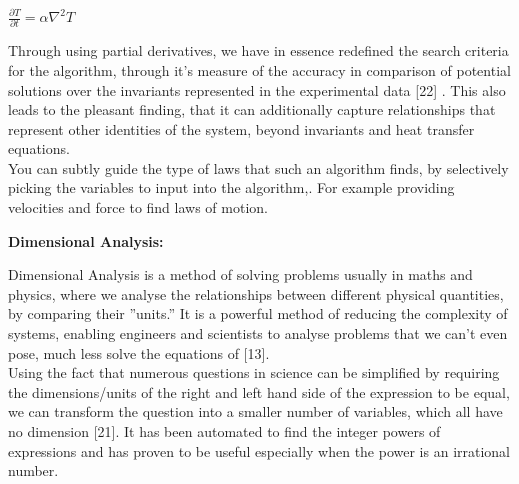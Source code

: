 \documentclass{article}
\begin{document}
\begin{center}
$\frac{\partial T}{\partial t} = \alpha \nabla^2 T$
\end{center}



Through using partial derivatives, we have in essence redefined the search criteria for the algorithm, through it's measure of the accuracy in comparison of potential solutions over the invariants represented in the experimental data [22] . This also leads to the pleasant finding, that it can additionally capture relationships that represent other identities of the system, beyond invariants and heat transfer equations. \\ 

You can subtly guide the type of laws that such an algorithm finds, by selectively picking the variables to input into the algorithm,. For example providing velocities and force to find laws of motion. \\ 





\begin{center} 
  \textbf {\Large Dimensional Analysis:}
\end{center}

Dimensional Analysis is a method of solving problems usually in maths and physics, where we analyse
the relationships between different physical quantities, by comparing their ”units.” It is a powerful
method of reducing the complexity of systems, enabling engineers and scientists to analyse problems
that we can’t even pose, much less solve the equations of [13].\\

Using the fact that numerous questions in science can be simplified by requiring the dimensions/units
of the right and left hand side of the expression to be equal, we can transform the question into
a smaller number of variables, which all have no dimension [21]. It has been automated to find the integer powers of expressions and has proven to be useful especially when the power is an irrational number.\\
\end{document}
